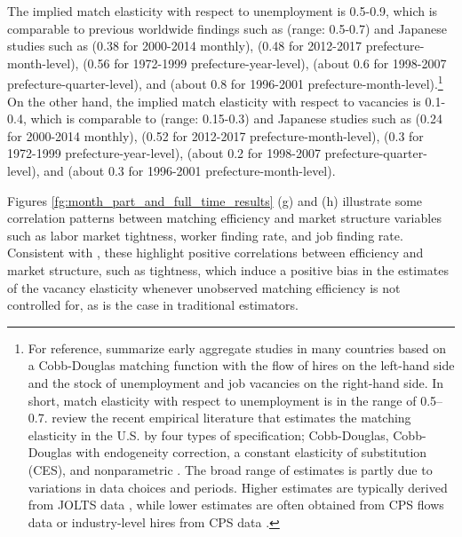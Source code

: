 \documentclass[12pt]{article}
\begin{document}
The implied match elasticity with respect to unemployment is 0.5-0.9, which is comparable to previous worldwide findings such as \cite{petrongolo2001looking} (range: 0.5-0.7) and Japanese studies such as \cite{higashi2018spatial} (0.38 for 2000-2014 monthly), \cite{kawata2019} (0.48 for 2012-2017 prefecture-month-level), \cite{kano2005estimating} (0.56 for 1972-1999 prefecture-year-level), \cite{sasaki2007measuring} (about 0.6 for 1998-2007 prefecture-quarter-level), and \cite{kambayashi2006vacancy} (about 0.8 for 1996-2001 prefecture-month-level).\footnote{For reference, \cite{petrongolo2001looking} summarize early aggregate studies in many countries based on a Cobb-Douglas matching function with the flow of hires on the left-hand side and the stock of unemployment and job vacancies on the right-hand side. In short, match elasticity with respect to unemployment is in the range of 0.5–0.7. \cite{bernstein2022matching} review the recent empirical literature that estimates the matching elasticity in the U.S. by four types of specification; Cobb-Douglas, Cobb-Douglas with endogeneity correction, a constant elasticity of substitution (CES), and nonparametric \citep{lange2020beyond}. The broad range of estimates is partly due to variations in data choices and periods. Higher estimates are typically derived from JOLTS data \citep{borowczyk2013accounting, csahin2014mismatch}, while lower estimates are often obtained from CPS flows data \citep{barnichon2015labor} or industry-level hires from CPS data \citep{csahin2014mismatch}.}
On the other hand, the implied match elasticity with respect to vacancies is 0.1-0.4, which is comparable to \cite{lange2020beyond} (range: 0.15-0.3) and Japanese studies such as \cite{higashi2018spatial} (0.24 for 2000-2014 monthly), \cite{kawata2019} (0.52 for 2012-2017 prefecture-month-level), \cite{kano2005estimating} (0.3 for 1972-1999 prefecture-year-level), \cite{sasaki2007measuring} (about 0.2 for 1998-2007 prefecture-quarter-level), and \cite{kambayashi2006vacancy} (about 0.3 for 1996-2001 prefecture-month-level).

Figures \ref{fg:month_part_and_full_time_results} (g) and (h) illustrate some correlation patterns between matching efficiency and market structure variables such as labor market tightness, worker finding rate, and job finding rate. Consistent with \cite{lange2020beyond}, these highlight positive correlations between efficiency and market structure, such as tightness, which induce a positive bias in the estimates of the vacancy elasticity whenever unobserved matching efficiency is not controlled for, as is the case in traditional estimators.
\end{document}
